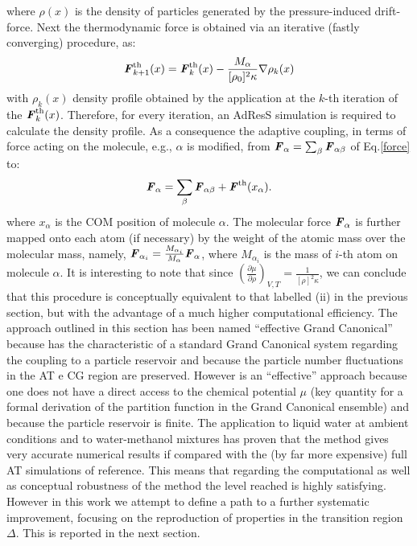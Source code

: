 \documentclass[aps,prb,preprint,citeautoscript]{revtex4}
\newcommand{\recheck}[1]{{\color{red} #1}}
\newcommand{\redc}[1]{{\color{red} #1}}
\renewcommand{\v}[1]{\textbf{\textit{#1}}}
\begin{document}
where $\rho(x)$ is the density of particles generated by the pressure-induced drift-force. Next the thermodynamic force is obtained via an iterative (fastly converging) procedure, as:
\begin{equation}
{\v F}_{k+1}^{\textrm{th}}(x)={\v F}_{k}^{\textrm{th}}(x)-\frac{M_{\alpha}}{[\rho_{0}]^{2}\kappa}\nabla\rho_{k}(x)
\label{iter}
\end{equation}
with $\rho_k(x)$ density profile obtained by the application at the $k$-th iteration of the ${\v F}_k^{\textrm{th}}(x)$.
\redc{Therefore, for every iteration, an AdResS simulation is required to calculate the density profile.}
As a consequence the adaptive coupling, in terms of force acting on the molecule, e.g., $\alpha$ is modified, from ${\v F}_{\alpha}=\sum_{\beta}{\v F}_{\alpha\beta}$ of Eq.\ref{force} to:
\begin{equation}
{\v F}_{\alpha}=\sum_{\beta}{\v F}_{\alpha\beta}+{\v F}^{\textrm{th}}(x_{\alpha}).
\label{mody}
\end{equation}
\recheck{
  where $x_\alpha$ is the COM position of molecule $\alpha$.
  The molecular force ${\v F}_{\alpha}$ 
  is further mapped onto each atom (if necessary) by the weight
of the atomic mass over the molecular mass, namely,
$\v F_{\alpha_i} = \frac{M_{\alpha_i}}{M_\alpha}\v F_{\alpha}$, where
$M_{\alpha_i}$ is the mass of $i$-th atom on molecule $\alpha$.}
 It is interesting to note that since $\left({\frac{\partial\mu}{\partial\rho}}\right)_{V,T}=\frac{1}{[\rho]^{2}\kappa}$, we can conclude that this procedure is conceptually equivalent to that labelled (ii) in the previous section, but with the advantage of a much higher computational efficiency.
The approach outlined in this section has been named ``effective Grand Canonical'' because has the characteristic of a standard Grand Canonical system regarding the coupling to a particle reservoir and because the particle number fluctuations in the AT e CG region are preserved. However is an ``effective'' approach because one does not have a direct access to the chemical potential $\mu$ (key quantity for a formal derivation of the partition function in the Grand Canonical ensemble) and because the particle reservoir is finite. The application to liquid water at ambient conditions \cite{prlgc} and to water-methanol mixtures \cite{debash} has proven that the method gives very accurate numerical results if compared with the (by far more expensive) full AT simulations of reference. This means that regarding the computational as well as conceptual robustness of the method the level reached is highly satisfying. However in this work we attempt to define a path to a further systematic improvement, focusing on the reproduction of properties in the transition region $\Delta$.
This is reported in the next section.
\end{document}
